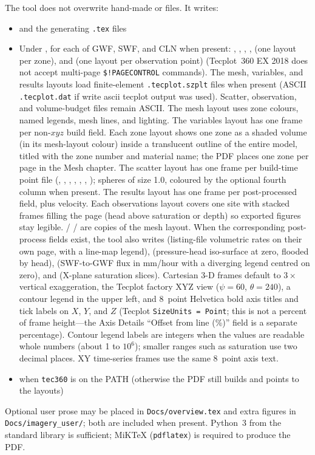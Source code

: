 The tool does not overwrite hand-made  or  files.  It writes:
\begin{itemize}
  \item {} and the generating \texttt{.tex} files
  \item Under , for each of GWF, SWF, and CLN when present:
        ,
        ,
        ,
        ,
         (one layout per zone), and
         (one layout per observation point)
        (Tecplot~360 EX 2018 does not accept multi-page \verb|$!PAGECONTROL| commands).
        The mesh, variables, and results layouts load finite-element \texttt{.tecplot.szplt} files when present
        (ASCII \texttt{.tecplot.dat} if {\sf write ascii tecplot output} was used).
        Scatter, observation, and volume-budget files remain ASCII.
        The mesh layout uses zone colours, named legends, mesh lines, and lighting.
        The variables layout has one frame per non-$xyz$ build field.
        Each zone layout shows one zone as a shaded volume (in its mesh-layout colour) inside a translucent
        outline of the entire model, titled with the zone number and material name;
        the PDF places one zone per page in the Mesh chapter.
        The scatter layout has one frame per build-time point file
        (, , , , , , );
        spheres of size 1.0, coloured by the optional fourth column when present.
        The results layout has one frame per post-processed field, plus velocity.
        Each observations layout covers one site with stacked frames filling the page
        (head above saturation or depth) so exported figures stay legible.
         /  /  are copies of the mesh layout.
        When the corresponding post-process fields exist, the tool also writes
         (listing-file volumetric rates on their own page, with a line-map legend),
         (pressure-head iso-surface at zero, flooded by head),
         (SWF-to-GWF flux in mm/hour with a diverging legend centred on zero), and
         (X-plane saturation slices).
        Cartesian 3-D frames default to $3\times$ vertical exaggeration, the Tecplot factory XYZ view
        ($\psi=60$, $\theta=240$), a contour legend in the upper left, and 8~point Helvetica bold axis titles
        and tick labels on $X$, $Y$, and $Z$ (Tecplot \texttt{SizeUnits = Point}; this is not a percent of frame
        height---the Axis Details ``Offset from line (\%)'' field is a separate percentage).
        Contour legend labels are integers when the values are readable whole numbers (about 1 to $10^{6}$);
        smaller ranges such as saturation use two decimal places.
        XY time-series frames use the same 8~point axis text.
  \item {} when \texttt{tec360} is on the PATH (otherwise the PDF still builds and points to the layouts)
\end{itemize}
Optional user prose may be placed in \texttt{Docs/overview.tex} and extra figures in \texttt{Docs/imagery\_user/}; both are included when present.  Python~3 from the standard library is sufficient; MiKTeX (\texttt{pdflatex}) is required to produce the PDF.


